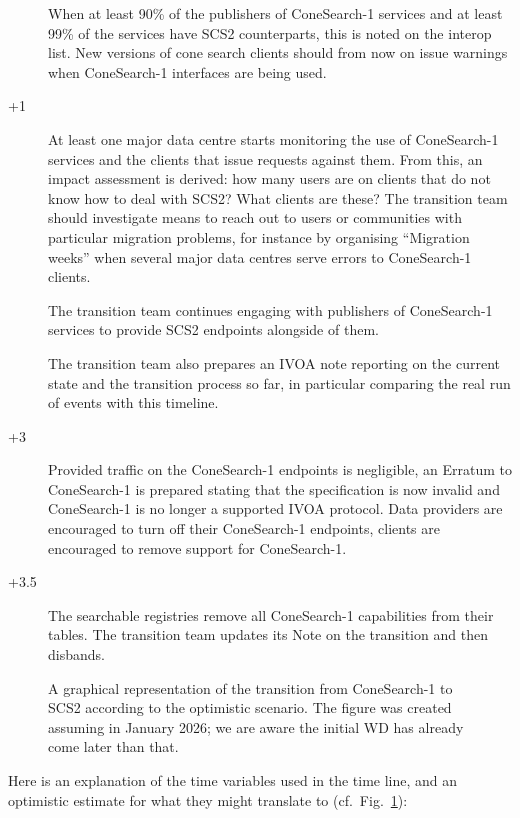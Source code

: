 \documentclass[11pt,a4paper]{ivoa}
\begin{document}
\begin{description}
\item[] When at least 90\% of the publishers of ConeSearch-1
services and at least 99\% of the services have SCS2 counterparts, this
is noted on the interop list.  New versions of cone search clients
should from now on issue warnings when ConeSearch-1 interfaces are being
used.

\item[+1] At least one major data centre starts monitoring the
use of ConeSearch-1 services and the clients that issue requests against
them.  From this, an impact assessment is derived: how many users are on
clients that do not know how to deal with SCS2?  What clients are these?
The transition team should investigate means to reach out to users or
communities with particular migration problems, for instance by
organising ``Migration weeks'' when several major data centres serve
errors to ConeSearch-1 clients.

The transition team continues engaging with publishers of ConeSearch-1
services to provide SCS2 endpoints alongside of them.

The transition team also prepares an IVOA note reporting on the current
state and the transition process so far, in particular comparing the
real run of events with this timeline.

\item[+3] Provided traffic on the ConeSearch-1 endpoints is
negligible, an Erratum to ConeSearch-1 is prepared stating that the
specification is now invalid and ConeSearch-1 is no longer a supported
IVOA protocol.  Data providers are encouraged to turn off their
ConeSearch-1 endpoints, clients are encouraged to remove support for
ConeSearch-1.

\item[+3.5] The searchable registries remove all ConeSearch-1
capabilities from their tables.  The transition team updates its Note on
the transition and then disbands.

\end{description}


\begin{figure}
\caption{A graphical representation of the transition from ConeSearch-1
to SCS2 according to the optimistic scenario.  The figure was created
assuming  in January 2026; we are aware the
initial WD has already come later than that.}
\label{fig:timeline}
\end{figure}

Here is an explanation of the time variables used in the time line, and
an optimistic estimate for what they might translate to
(cf.~Fig.~\ref{fig:timeline}):
\end{document}
